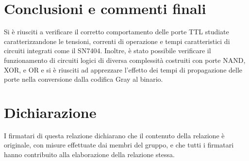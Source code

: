 \documentclass[10pt, a4paper, italian]{article}
\begin{document}
\section*{Conclusioni e commenti finali}
Si è riusciti a verificare il corretto comportamento delle porte TTL studiate
caratterizzandone le tensioni, correnti di operazione e tempi caratteristici
di circuiti integrati come il SN7404.
Inoltre, è stato possibile verificare il funzionamento di circuiti logici di
diversa complessità costruiti con porte NAND, XOR, e OR e si è riusciti ad
apprezzare l'effetto dei tempi di propagazione delle porte nella conversione
dalla codifica Gray al binario.


\section*{Dichiarazione}
I firmatari di questa relazione dichiarano che il contenuto della relazione \`e
originale, con misure effettuate dai membri del gruppo, e che tutti i firmatari
hanno contribuito alla elaborazione della relazione stessa.
\end{document}
